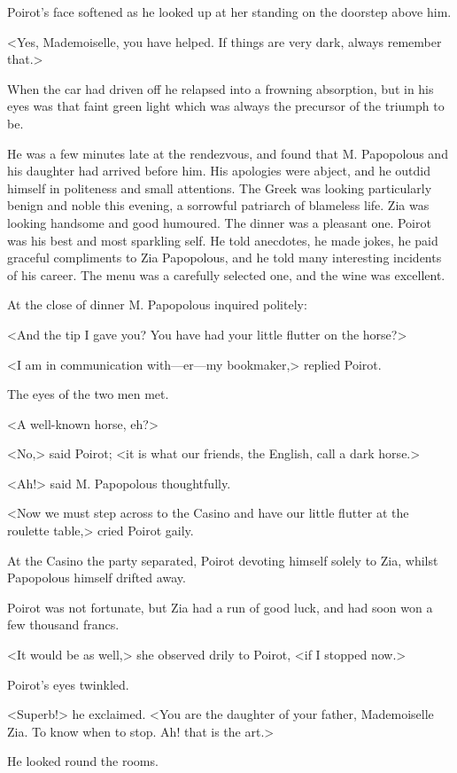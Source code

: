 Poirot's face softened as he looked up at her standing on the doorstep above him.

<Yes, Mademoiselle, you have helped. If things are very dark, always remember that.>

When the car had driven off he relapsed into a frowning absorption, but in his eyes was that faint green light which was always the precursor of the triumph to be.

He was a few minutes late at the rendezvous, and found that M. Papopolous and his daughter had arrived before him. His apologies were abject, and he outdid himself in politeness and small attentions. The Greek was looking particularly benign and noble this evening, a sorrowful patriarch of blameless life. Zia was looking handsome and good humoured. The dinner was a pleasant one. Poirot was his best and most sparkling self. He told anecdotes, he made jokes, he paid graceful compliments to Zia Papopolous, and he told many interesting incidents of his career. The menu was a carefully selected one, and the wine was excellent.

At the close of dinner M. Papopolous inquired politely:

<And the tip I gave you? You have had your little flutter on the horse?>

<I am in communication with—er—my bookmaker,> replied Poirot.

The eyes of the two men met.

<A well-known horse, eh?>

<No,> said Poirot; <it is what our friends, the English, call a dark horse.>

<Ah!> said M. Papopolous thoughtfully.

<Now we must step across to the Casino and have our little flutter at the roulette table,> cried Poirot gaily.

At the Casino the party separated, Poirot devoting himself solely to Zia, whilst Papopolous himself drifted away.

Poirot was not fortunate, but Zia had a run of good luck, and had soon won a few thousand francs.

<It would be as well,> she observed drily to Poirot, <if I stopped now.>

Poirot's eyes twinkled.

<Superb!> he exclaimed. <You are the daughter of your father, Mademoiselle Zia. To know when to stop. Ah! that is the art.>

He looked round the rooms.

